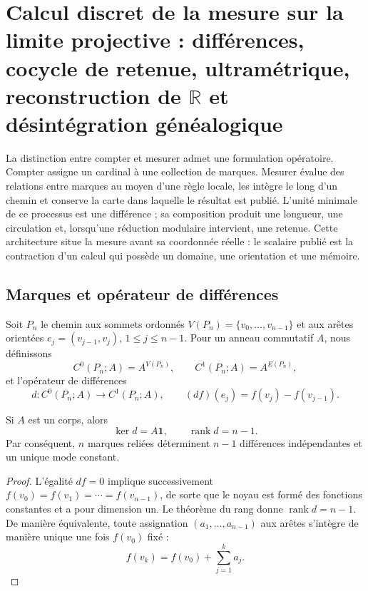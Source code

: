 \section{Calcul discret de la mesure sur la limite projective : différences, cocycle de retenue, ultramétrique, reconstruction de \texorpdfstring{\(\mathbb R\)}{R} et désintégration généalogique}
\label{sec:complejo-discreto-medida-rev2}

La distinction entre compter et mesurer admet une formulation opératoire. Compter
assigne un cardinal à une collection de marques. Mesurer évalue des relations
entre marques au moyen d'une règle locale, les intègre le long d'un chemin et
conserve la carte dans laquelle le résultat est publié. L'unité minimale de ce
processus est une différence ; sa composition produit une longueur, une circulation et,
lorsqu'une réduction modulaire intervient, une retenue. Cette architecture situe la
mesure avant sa coordonnée réelle : le scalaire publié est la contraction d'un
calcul qui possède un domaine, une orientation et une mémoire.

\subsection{Marques et opérateur de différences}

Soit \(P_n\) le chemin aux sommets ordonnés
\(V(P_n)=\{v_0,\ldots,v_{n-1}\}\) et aux arêtes orientées
\(e_j=(v_{j-1},v_j)\), \(1\leq j\leq n-1\). Pour un anneau commutatif
\(A\), nous définissons
\[
 C^0(P_n;A)=A^{V(P_n)},
 \qquad
 C^1(P_n;A)=A^{E(P_n)},
\]
et l'opérateur de différences
\begin{equation}
 d:C^0(P_n;A)\longrightarrow C^1(P_n;A),
 \qquad
 (df)(e_j)=f(v_j)-f(v_{j-1}).
 \label{eq:diferencia-cero-uno-rev2}
\end{equation}

\begin{theorem}
\label{thm:rango-diferencias-camino-rev2}
Si \(A\) est un corps, alors
\[
 \ker d=A\mathbf 1,
 \qquad
 \operatorname{rank}d=n-1.
\]
Par conséquent, \(n\) marques reliées déterminent \(n-1\) différences
indépendantes et un unique mode constant.
\end{theorem}

\begin{proof}
L'égalité \(df=0\) implique successivement
\(f(v_0)=f(v_1)=\cdots=f(v_{n-1})\), de sorte que le noyau est formé des
fonctions constantes et a pour dimension un. Le théorème du
rang donne \(\operatorname{rank}d=n-1\). De manière équivalente, toute
assignation \((a_1,\ldots,a_{n-1})\) aux arêtes s'intègre de manière unique
une fois \(f(v_0)\) fixé :
\[
 f(v_k)=f(v_0)+\sum_{j=1}^{k}a_j.
\]
\end{proof}

